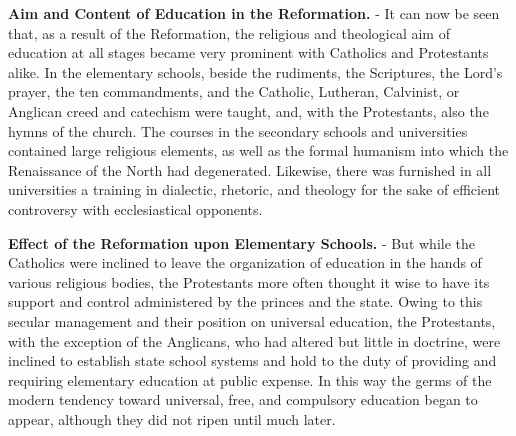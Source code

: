 \documentclass[]{book}
\begin{document}
\textbf{Aim and Content of Education in the Reformation.} - It can now be seen that, as a result of the Reformation, the religious and theological aim of education at all stages became very prominent with Catholics and Protestants alike. In the elementary schools, beside the rudiments, the Scriptures, the Lord's prayer, the ten commandments, and the Catholic, Lutheran, Calvinist, or Anglican creed and catechism were taught, and, with the Protestants, also the hymns of the church. The courses in the secondary schools and universities contained large religious elements, as well as the formal humanism into which the Renaissance of the North had degenerated. Likewise, there was furnished in all universities a training in dialectic, rhetoric, and theology for the sake of efficient controversy with ecclesiastical opponents.

\textbf{Effect of the Reformation upon Elementary Schools.} - But while the Catholics were inclined to leave the organization of education in the hands of various religious bodies, the Protestants more often thought it wise to have its support and control administered by the princes and the state. Owing to this secular management and their position on universal education, the Protestants, with the exception of the Anglicans, who had altered but little in doctrine, were inclined to establish state school systems and hold to the duty of providing and requiring elementary education at public expense. In this way the germs of the modern tendency toward universal, free, and compulsory education began to appear, although they did not ripen until much later.
\end{document}
